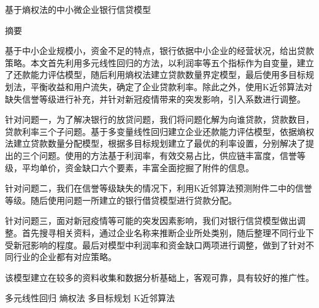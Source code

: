 \documentclass{my_paper}
\newcommand{\lunwenbiaoti}{\fontsize{15.75pt}{0}\heiti 基于熵权法的中小微企业银行信贷模型}
\newcommand{\zhaiyao}{\fontsize{14pt}{0}\heiti 摘要}
\begin{document}
\newpage
\begin{center}
\lunwenbiaoti

\vspace{2ex}
\zhaiyao
\end{center}

基于中小企业规模小，资金不足的特点，银行依据中小企业的经营状况，给出贷款策略。本文首先利用多元线性回归的方法，以利润率等五个指标作为自变量，建立了还款能力评估模型，随后利用熵权法建立贷款数量界定模型，最后使用多目标规划法，平衡收益和用户流失，确定了企业贷款利率。除此之外，使用K近邻算法对缺失信誉等级进行补充，并针对新冠疫情带来的突发影响，引入系数进行调整。

针对问题一，为了解决银行的放贷问题，我们将问题化解为向谁贷款，贷款数目，贷款利率三个子问题。基于多变量线性回归建立企业还款能力评估模型，依据熵权法建立贷款数量分配模型，根据多目标规划建立了最优的利率设置，分别解决了提出的三个问题。使用的方法基于利润率，有效交易占比，供应链丰富度，信誉等级，平均单价，资金缺口六个要素，丰富全面挖掘了附件的信息。

针对问题二，我们在信誉等级缺失的情况下，利用K近邻算法预测附件二中的信誉等级。随后使用问题一所建立的银行借贷模型进行贷款分配。

针对问题三，面对新冠疫情等可能的突发因素影响，我们对银行信贷模型做出调整。首先搜寻相关资料，通过企业名称来推断企业所处类别，随后整理不同行业下受新冠影响的程度。最后对模型中利润率和资金缺口两项进行调整，做到了针对不同行业的企业都有对应策略。

该模型建立在较多的资料收集和数据分析基础上，客观可靠，具有较好的推广性。

\begin{guanjianci}
多元线性回归  \quad 熵权法 \quad 多目标规划 \quad K近邻算法
\end{guanjianci}
\end{document}

